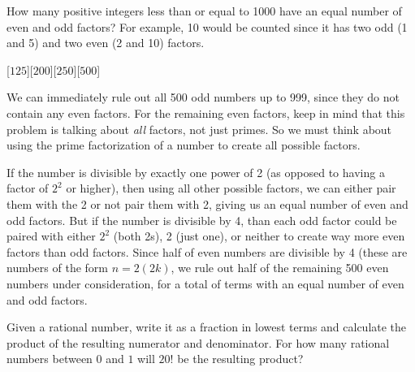 \begin{problem}
    How many positive integers less than or equal to 1000 have an equal number of even and odd factors? For example, 10 would be counted since it has two odd (1 and 5) and two even (2 and 10) factors.
\end{problem}
[$125$][$200$][$250$][$500$]

\begin{solution}[D]
    We can immediately rule out all 500 odd numbers up to 999, since they do not contain any even factors. For the remaining even factors, keep in mind that this problem is talking about \emph{all} factors, not just primes. So we must think about using the prime factorization of a number to create all possible factors.
        
    If the number is divisible by exactly one power of 2 (as opposed to having a factor of \(2^2\) or higher), then using all other possible factors, we can either pair them with the 2 or not pair them with 2, giving us an equal number of even and odd factors. But if the number is divisible by 4, than each odd factor could be paired with either \(2^2\) (both 2s), 2 (just one), or neither to create way more even factors than odd factors. Since half of even numbers are divisible by 4 (these are numbers of the form \( n=2(2k) \), we rule out half of the remaining 500 even numbers under consideration, for a total of  terms with an equal number of even and odd factors.
\end{solution}

\begin{problem}[C][1][AIME 1991/5]
    Given a rational number, write it as a fraction in lowest terms and calculate the product of the resulting numerator and denominator. For how many rational numbers between $0$ and $1$ will $20!$ be the resulting product? 
\end{problem}

